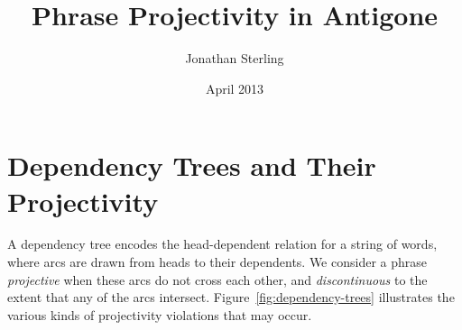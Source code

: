 \documentclass{article}
\newcommand{\Varid}[1]{\mathit{#1}}
\def\resethooks{%
  \global\let\SaveRestoreHook\empty
  \global\let\ColumnHook\empty}
\let\hspre\empty
\let\hspost\empty
\newcommand\VarId[1]{\mathord{\textcolor{VarId}{#1}}}
\let\Varid\VarId
\newcommand\VarSym[1]{\mathbin{\textcolor{VarSym}{#1}}}
\newcommand\Comment[1]{\textcolor{Comment}{\textit{\textsf{#1}}}}
\newcommand{\FN}{\mathsf}
\newcommand{\ignore}[1]{}
\begin{document}
\setmainfont{Times New Roman}

\author{Jonathan Sterling}

\title{Phrase Projectivity in Antigone}
\date{April 2013}
\maketitle

\ignore{
\begin{hscode}\SaveRestoreHook
\column{B}{@{}>{\hspre}l<{\hspost}@{}}%
\column{3}{@{}>{\hspre}l<{\hspost}@{}}%
\column{E}{@{}>{\hspre}l<{\hspost}@{}}%
\>[3]{}\Comment{\{-\#\enskip LANGUAGE StandaloneDeriving \enskip\#-\}}{}\<[E]%
\ColumnHook
\end{hscode}\resethooks
\begin{hscode}\SaveRestoreHook
\column{B}{@{}>{\hspre}l<{\hspost}@{}}%
\column{3}{@{}>{\hspre}l<{\hspost}@{}}%
\column{E}{@{}>{\hspre}l<{\hspost}@{}}%
\>[3]{}\mathkw{module}\;\mathsf{Analyze}\;\mathkw{where}{}\<[E]%
\\
\>[3]{}\mathkw{import}\;\mathsf{\mathsf{Control}.Applicative}{}\<[E]%
\\
\>[3]{}\mathkw{import}\;\mathsf{\mathsf{Control}.Arrow}\;((\VarSym{\&\&\&})){}\<[E]%
\\
\>[3]{}\mathkw{import}\;\mathsf{\mathsf{Data}.Foldable}{}\<[E]%
\\
\>[3]{}\mathkw{import}\;\mathsf{\mathsf{Debug}.Trace}{}\<[E]%
\\
\>[3]{}\mathkw{import}\;\mathsf{\mathsf{Data}.Maybe}\;(\Varid{isJust},\FN{maybeToList}){}\<[E]%
\\
\>[3]{}\mathkw{import}\;\mathsf{\mathsf{Data}.Tree}{}\<[E]%
\\
\>[3]{}\mathkw{import}\;\mathsf{\mathsf{Data}.List}\;(\FN{length},\Varid{nub},\Varid{findIndex},\FN{sortBy}){}\<[E]%
\\
\>[3]{}\mathkw{import}\;\mathsf{\mathsf{Data}.Function}\;(\FN{on}){}\<[E]%
\\
\>[3]{}\mathkw{import}\;\mathsf{Prelude}\;\Varid{hiding}\;(\FN{maximum},\FN{minimum},\FN{foldl},\cdot \notin\cdot ,\Varid{elem},\FN{concat},\FN{sum}){}\<[E]%
\ColumnHook
\end{hscode}\resethooks
}

\section{Dependency Trees and Their Projectivity}

A dependency tree encodes the head-dependent relation for a string of words,
where arcs are drawn from heads to their dependents. We consider a phrase
\emph{projective} when these arcs do not cross each other, and
\emph{discontinuous} to the extent that any of the arcs intersect.
Figure~\ref{fig:dependency-trees} illustrates the various kinds of projectivity
violations that may occur.
\end{document}
